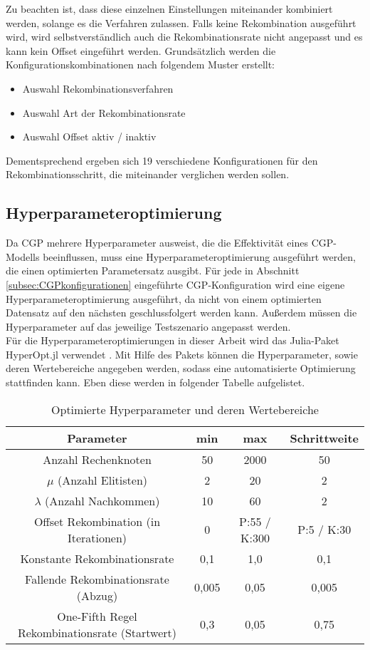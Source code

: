 Zu beachten ist, dass diese einzelnen Einstellungen miteinander kombiniert werden, solange es die Verfahren zulassen.
Falls keine Rekombination ausgeführt wird, wird selbstverständlich auch die Rekombinationsrate nicht angepasst und es kann kein Offset eingeführt werden.
Grundsätzlich werden die Konfigurationskombinationen nach folgendem Muster erstellt:
\begin{itemize}
	\item Auswahl Rekombinationsverfahren
	\item Auswahl Art der Rekombinationsrate
	\item Auswahl Offset aktiv / inaktiv
\end{itemize}

Dementsprechend ergeben sich 19 verschiedene Konfigurationen für den Rekombinationsschritt, die miteinander verglichen werden sollen. 


\subsection{Hyperparameteroptimierung}
\label{subsec:hpo}

Da CGP mehrere Hyperparameter ausweist, die die Effektivität eines CGP-Modells beeinflussen, muss eine Hyperparameteroptimierung ausgeführt werden, die einen optimierten Parametersatz ausgibt.
Für jede in Abschnitt \ref{subsec:CGPkonfigurationen} eingeführte CGP-Konfiguration wird eine eigene Hyperparameteroptimierung ausgeführt, da nicht von einem optimierten Datensatz auf den nächsten geschlussfolgert werden kann.
Außerdem müssen die Hyperparameter auf das jeweilige Testszenario angepasst werden.\\
Für die Hyperparameteroptimierungen in dieser Arbeit wird das Julia-Paket HyperOpt.jl verwendet \cite{carlson_baggepinnenhyperoptjl_2025}.
Mit Hilfe des Pakets können die Hyperparameter, sowie deren Wertebereiche angegeben werden, sodass eine automatisierte Optimierung stattfinden kann.
Eben diese werden in folgender Tabelle aufgelistet.

\begin{table}[h]
	\centering
	\begin{tabular}{c | c | c | c}
		\textbf{Parameter} & \textbf{min} & \textbf{max} & \textbf{Schrittweite}\\
		\hline
		Anzahl Rechenknoten & 50 & 2000 & 50 \\
		\hline
		$\mu$ (Anzahl Elitisten) & 2 & 20 & 2\\
		\hline
		$\lambda$ (Anzahl Nachkommen) & 10 & 60 & 2 \\
		\hline
		Offset Rekombination (in Iterationen)& 0 & P:55 / K:300 & P:5 / K:30\\
		\hline
		Konstante Rekombinationsrate & 0,1 & 1,0 & 0,1\\
		\hline
		Fallende Rekombinationsrate (Abzug) & 0,005 & 0,05 & 0,005\\
		\hline
		One-Fifth Regel Rekombinationsrate (Startwert) & 0,3 & 0,05 & 0,75\\
	\end{tabular}
	\caption{Optimierte Hyperparameter und deren Wertebereiche}
	\label{table:hyperopt}
\end{table}

